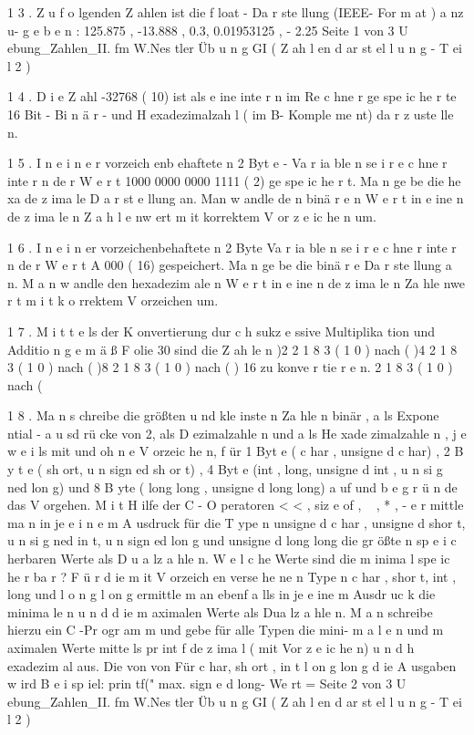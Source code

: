 \documentclass[12pt,a4paper]{scrreprt}
\begin{document}
1 3 . Z u f o lgenden Z ahlen ist die f loat - Da r ste llung (IEEE- For m at ) a nz u-
g e b e n : 125.875 , -13.888 , 0.3, 0.01953125 , - 2.25
Seite 1 von 3
U ebung_Zahlen_II. fm
W.Nes tler
Üb u n g GI ( Z ah l en d ar st el l u n g - T ei l 2 )

1 4 . D i e Z ahl -32768 ( 10) ist als e ine inte r n im Re c hne r ge spe ic he r te 16 Bit -
Bi n ä r - und H exadezimalzah l ( im B- Komple me nt) da r z uste lle n.

1 5 . I n e i n e r vorzeich enb ehaftete n 2 Byt e - Va r ia ble n se i r e c hne r inte r n de r
W e r t 1000 0000 0000 1111 ( 2) ge spe ic he r t. Ma n ge be die he xa de z ima le
D a r st e llung an. Man w andle de n binä r e n W e r t in e ine n de z ima le n
Z a h l e nw ert m it korrektem V or z e ic he n um.

1 6 . I n e i n er vorzeichenbehaftete n 2 Byte Va r ia ble n se i r e c hne r inte r n de r
W e r t A 000 ( 16) gespeichert. Ma n ge be die binä r e Da r ste llung a n.
M a n w andle den hexadezim ale n W e r t in e ine n de z ima le n Za hle nwe r t
m i t k o rrektem V orzeichen um.

1 7 . M i t t e ls der K onvertierung dur c h sukz e ssive Multiplika tion und Additio n
g e m ä ß F olie 30 sind die Z ah le n
)2
2 1 8 3 ( 1 0 ) nach (
)4
2 1 8 3 ( 1 0 ) nach (
)8
2 1 8 3 ( 1 0 ) nach (
) 16 zu konve r tie r e n.
2 1 8 3 ( 1 0 ) nach (

1 8 . Ma n s chreibe die größten u nd kle inste n Za hle n binär , a ls Expone ntial -
a u sd rü cke von 2, als D ezimalzahle n und a ls He xade zimalzahle n ,
j e w e i ls mit und oh n e V orzeic he n, f ür 1 Byt e ( c har , unsigne d c har) ,
2 B y t e ( sh ort, u n sign ed sh or t) , 4 Byt e (int , long, unsigne d int ,
u n si g ned lon g) und 8 B yte ( long long , unsigne d long long) a uf und
b e g r ü n de das V orgehen.
M i t H ilfe der C - O peratoren < < , siz e of , ~ , * , - e r mittle ma n in je
e i n e m A usdruck für die T ype n unsigne d c har , unsigne d shor t,
u n si g ned in t, u n sign ed lon g und unsigne d long long die gr ößte n
sp e i c herbaren Werte als D u a lz a hle n.
W e l c he Werte sind die m inima l spe ic he r ba r ?
F ü r d ie m it V orzeich en verse he ne n Type n c har , shor t, int , long und
l o n g l on g ermittle m an ebenf a lls in je e ine m Ausdr uc k die minima le n
u n d d ie m aximalen Werte als Dua lz a hle n.
M a n schreibe hierzu ein C -Pr ogr am m und gebe für alle Typen die mini-
m a l e n und m aximalen Werte mitte ls pr int f de z ima l ( mit Vor z e ic he n)
u n d h exadezim al aus.
Die
von
von
Für
c har, sh ort , in t %
l on g lon g %
d ie A usgaben w ird %
B e i sp iel: prin tf(" max. sign e d long- We rt = %
Seite 2 von 3
U ebung_Zahlen_II. fm
W.Nes tler
Üb u n g GI ( Z ah l en d ar st el l u n g - T ei l 2 )
\end{document}
